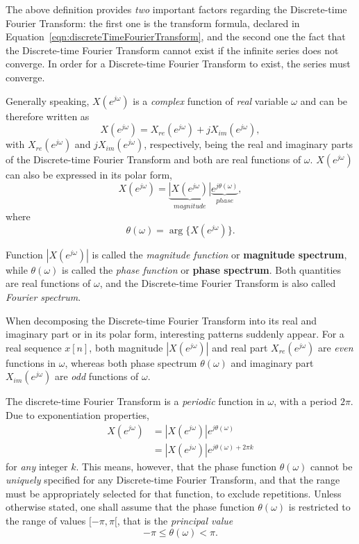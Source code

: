 \documentclass[\documentfontsize, twocolumn]{\classname}
\begin{document}
The above definition provides \emph{two} important factors regarding the Discrete-time Fourier Transform: the first one is the transform formula, declared in Equation~\ref{eqn:discreteTimeFourierTransform}, and the second one the fact that the Discrete-time Fourier Transform cannot exist if the infinite series does not converge. In order for a Discrete-time Fourier Transform to exist, the series must converge.

Generally speaking, $X(e^{j\omega})$ is a \emph{complex} function of \emph{real} variable $\omega$ and can be therefore written as
\[
    X(e^{j\omega}) = X_{re}(e^{j\omega}) + jX_{im}(e^{j\omega}),
\]
with $X_{re}(e^{j\omega})$ and $jX_{im}(e^{j\omega})$, respectively, being the real and imaginary parts of the Discrete-time Fourier Transform and both are real functions of $\omega$. $X(e^{j\omega})$ can also be expressed in its polar form,
\[
    X(e^{j\omega}) = \underbrace{\left|X(e^{j\omega})\right|}_{magnitude}\underbrace{e^{j\theta(\omega)}}_{phase},
\]
where \[\theta(\omega) = \arg\{X(e^{j\omega})\}.\]

Function $\left|X(e^{j\omega})\right|$ is called the \emph{magnitude function} or \textbf{magnitude spectrum}, while $\theta(\omega)$ is called the \emph{phase function} or \textbf{phase spectrum}. Both quantities are real functions of $\omega$, and the Discrete-time Fourier Transform is also called \emph{Fourier spectrum}.

When decomposing the Discrete-time Fourier Transform into its real and imaginary part or in its polar form, interesting patterns suddenly appear. For a real sequence $x[n]$, both magnitude $\left|X(e^{j\omega})\right|$ and real part $X_{re}(e^{j\omega})$ are \emph{even} functions in $\omega$, whereas both phase spectrum $\theta(\omega)$ and imaginary part $X_{im}(e^{j\omega})$ are \emph{odd} functions of $\omega$.

The discrete-time Fourier Transform is a \emph{periodic} function in $\omega$, with a period $2\pi$.
Due to exponentiation properties,
\begin{align*}
    X(e^{j\omega}) &= \left|X(e^{j\omega})\right|e^{j\theta(\omega)}\\
                   &= \left|X(e^{j\omega})\right|e^{j\theta(\omega) + 2\pi k}
\end{align*}
for \emph{any} integer $k$. This means, however, that the phase function $\theta(\omega)$ cannot be \emph{uniquely} specified for any Discrete-time Fourier Transform, and that the range must be appropriately selected for that function, to exclude repetitions. Unless otherwise stated, one shall assume that the phase function $\theta(\omega)$ is restricted to the range of values $[-\pi,\pi[$, that is the \emph{principal value}
\begin{equation}\label{eqn:phasePrincipalValue}
    -\pi \leq \theta(\omega) < \pi.
\end{equation}
\end{document}
